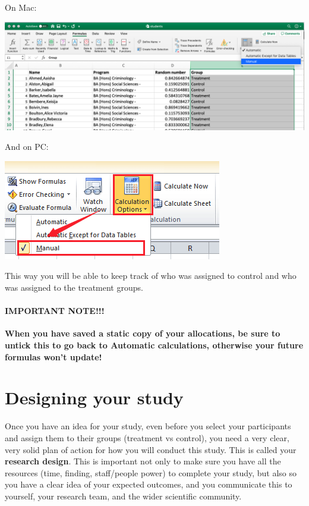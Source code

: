 \documentclass[
]{book}
\begin{document}
On Mac:

\includegraphics{imgs/calc_man.png}

And on PC:

\includegraphics{imgs/pc_manual_calc_opt_2.png}

This way you will be able to keep track of who was assigned to control and who was assigned to the treatment groups.

\hypertarget{important-note}{%
\paragraph{IMPORTANT NOTE!!!}\label{important-note}}

\textbf{When you have saved a static copy of your allocations, be sure to untick this to go back to Automatic calculations, otherwise your future formulas won't update!}

\hypertarget{designing-your-study}{%
\section{Designing your study}\label{designing-your-study}}

Once you have an idea for your study, even before you select your participants and assign them to their groups (treatment vs control), you need a very clear, very solid plan of action for how you will conduct this study. This is called your \textbf{research design}. This is important not only to make sure you have all the resources (time, finding, staff/people power) to complete your study, but also so you have a clear idea of your expected outcomes, and you communicate this to yourself, your research team, and the wider scientific community.
\end{document}
